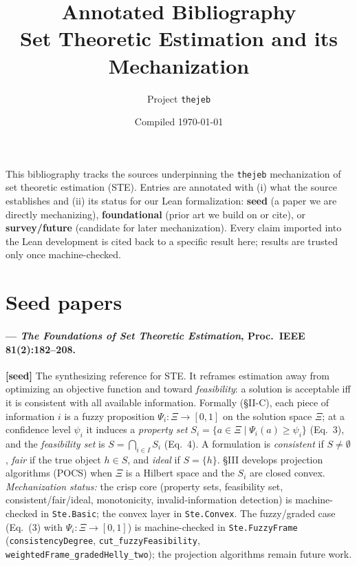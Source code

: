 \documentclass[11pt]{article}
\title{Annotated Bibliography\\\large Set Theoretic Estimation and its Mechanization}
\author{Project \texttt{thejeb}}
\date{Compiled \today}
\begin{document}
\maketitle

\noindent
This bibliography tracks the sources underpinning the \texttt{thejeb}
mechanization of set theoretic estimation (STE). Entries are annotated
with (i) what the source establishes and (ii) its status for our Lean
formalization: \textbf{seed} (a paper we are directly mechanizing),
\textbf{foundational} (prior art we build on or cite), or
\textbf{survey/future} (candidate for later mechanization). Every claim
imported into the Lean development is cited back to a specific result
here; results are trusted only once machine-checked.

\section*{Seed papers}

\paragraph{\citet{combettes1993} --- \emph{The Foundations of Set
Theoretic Estimation}, Proc.\ IEEE 81(2):182--208.} \textbf{[seed]}
The synthesizing reference for STE. It reframes estimation away from
optimizing an objective function and toward \emph{feasibility}: a
solution is acceptable iff it is consistent with all available
information. Formally (\S II-C), each piece of information $i$ is a fuzzy
proposition $\Psi_i:\Xi\to[0,1]$ on the solution space $\Xi$; at a
confidence level $\psi_i$ it induces a \emph{property set}
$S_i=\{a\in\Xi\mid\Psi_i(a)\ge\psi_i\}$ (Eq.~3), and the
\emph{feasibility set} is $S=\bigcap_{i\in I}S_i$ (Eq.~4). A formulation
is \emph{consistent} if $S\ne\emptyset$, \emph{fair} if the true object
$h\in S$, and \emph{ideal} if $S=\{h\}$. \S III develops projection
algorithms (POCS) when $\Xi$ is a Hilbert space and the $S_i$ are closed
convex. \emph{Mechanization status:} the crisp core (property sets,
feasibility set, consistent/fair/ideal, monotonicity, invalid-information
detection) is machine-checked in \texttt{Ste.Basic}; the convex layer in
\texttt{Ste.Convex}. The fuzzy/graded case (Eq.~(3) with
$\Psi_i:\Xi\to[0,1]$) is machine-checked in \texttt{Ste.FuzzyFrame}
(\texttt{consistencyDegree}, \texttt{cut\_fuzzyFeasibility},
\texttt{weightedFrame\_gradedHelly\_two}); the projection algorithms
remain future work.
\end{document}
